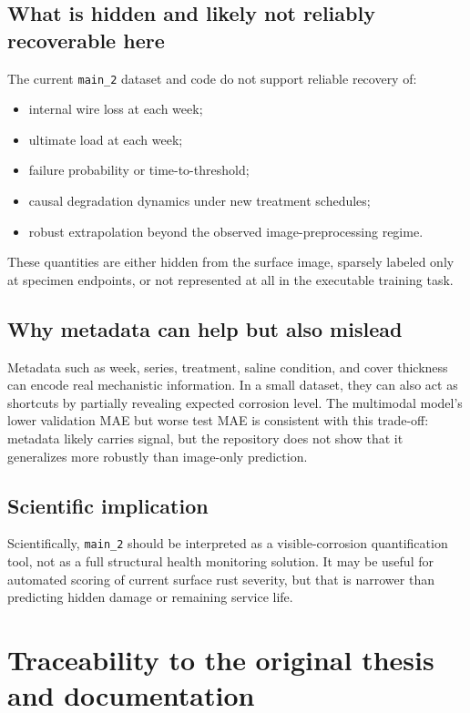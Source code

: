 \documentclass[11pt]{article}
\begin{document}
\subsection{What is hidden and likely not reliably recoverable here}
The current \texttt{main\_2} dataset and code do not support reliable recovery of:
\begin{itemize}
  \item internal wire loss at each week;
  \item ultimate load at each week;
  \item failure probability or time-to-threshold;
  \item causal degradation dynamics under new treatment schedules;
  \item robust extrapolation beyond the observed image-preprocessing regime.
\end{itemize}

These quantities are either hidden from the surface image, sparsely labeled only at specimen endpoints, or not represented at all in the executable training task.

\subsection{Why metadata can help but also mislead}
Metadata such as week, series, treatment, saline condition, and cover thickness can encode real mechanistic information. In a small dataset, they can also act as shortcuts by partially revealing expected corrosion level. The multimodal model's lower validation MAE but worse test MAE is consistent with this trade-off: metadata likely carries signal, but the repository does not show that it generalizes more robustly than image-only prediction.

\subsection{Scientific implication}
Scientifically, \texttt{main\_2} should be interpreted as a visible-corrosion quantification tool, not as a full structural health monitoring solution. It may be useful for automated scoring of current surface rust severity, but that is narrower than predicting hidden damage or remaining service life.

\section{Traceability to the original thesis and documentation}
\end{document}
